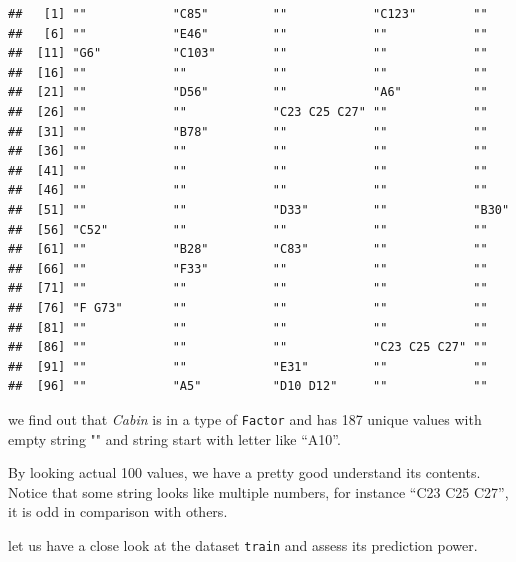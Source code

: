 \documentclass[
]{book}
\newenvironment{Shaded}{\begin{snugshade}}{\end{snugshade}}
\newcommand{\CommentTok}[1]{\textcolor[rgb]{0.56,0.35,0.01}{\textit{#1}}}
\newcommand{\KeywordTok}[1]{\textcolor[rgb]{0.13,0.29,0.53}{\textbf{#1}}}
\newcommand{\NormalTok}[1]{#1}
\newcommand{\OperatorTok}[1]{\textcolor[rgb]{0.81,0.36,0.00}{\textbf{#1}}}
\newcommand{\StringTok}[1]{\textcolor[rgb]{0.31,0.60,0.02}{#1}}
\begin{document}
\begin{verbatim}
##   [1] ""            "C85"         ""            "C123"        ""           
##   [6] ""            "E46"         ""            ""            ""           
##  [11] "G6"          "C103"        ""            ""            ""           
##  [16] ""            ""            ""            ""            ""           
##  [21] ""            "D56"         ""            "A6"          ""           
##  [26] ""            ""            "C23 C25 C27" ""            ""           
##  [31] ""            "B78"         ""            ""            ""           
##  [36] ""            ""            ""            ""            ""           
##  [41] ""            ""            ""            ""            ""           
##  [46] ""            ""            ""            ""            ""           
##  [51] ""            ""            "D33"         ""            "B30"        
##  [56] "C52"         ""            ""            ""            ""           
##  [61] ""            "B28"         "C83"         ""            ""           
##  [66] ""            "F33"         ""            ""            ""           
##  [71] ""            ""            ""            ""            ""           
##  [76] "F G73"       ""            ""            ""            ""           
##  [81] ""            ""            ""            ""            ""           
##  [86] ""            ""            ""            "C23 C25 C27" ""           
##  [91] ""            ""            "E31"         ""            ""           
##  [96] ""            "A5"          "D10 D12"     ""            ""
\end{verbatim}

we find out that \emph{Cabin} is in a type of \texttt{Factor} and has 187 unique values with empty string "" and string start with letter like ``A10''.

By looking actual 100 values, we have a pretty good understand its contents. Notice that some string looks like multiple numbers, for instance ``C23 C25 C27'', it is odd in comparison with others.

let us have a close look at the dataset \texttt{train} and assess its prediction power.

\begin{Shaded}
\end{Shaded}
\end{document}
